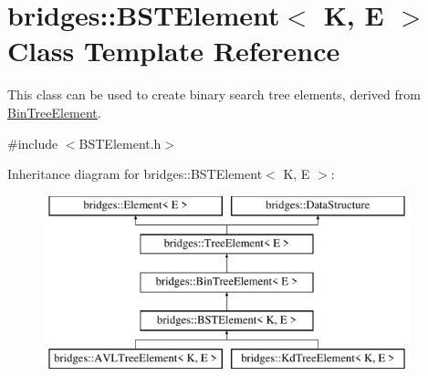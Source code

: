 \hypertarget{classbridges_1_1_b_s_t_element}{}\section{bridges\+::B\+S\+T\+Element$<$ K, E $>$ Class Template Reference}
\label{classbridges_1_1_b_s_t_element}


This class can be used to create binary search tree elements, derived from \mbox{\hyperlink{classbridges_1_1_bin_tree_element}{Bin\+Tree\+Element}}.  




{\ttfamily \#include $<$B\+S\+T\+Element.\+h$>$}

Inheritance diagram for bridges\+::B\+S\+T\+Element$<$ K, E $>$\+:\begin{figure}[H]
\begin{center}
\leavevmode
\includegraphics[height=5.000000cm]{classbridges_1_1_b_s_t_element}
\end{center}
\end{figure}
